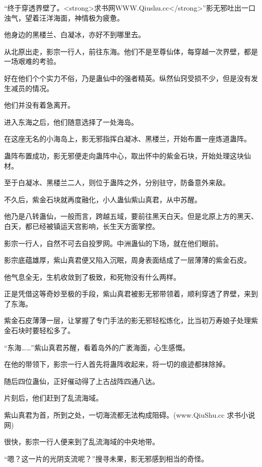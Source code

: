
\begin{this_body}

“终于穿透界壁了。<strong>求书网WWW.Qiushu.cc</strong>”影无邪吐出一口浊气，望着汪洋海面，神情极为疲惫。

他身边的黑楼兰、白凝冰，亦好不到哪里去。

从北原出走，影宗一行人，前往东海。他们不是至尊仙体，每穿越一次界壁，都是一场艰难的考验。

好在他们个个实力不俗，乃是蛊仙中的强者精英。纵然仙窍受损不少，但是没有发生减员的情况。

他们并没有着急离开。

进入东海之后，他们随意选择了一处海岛。

在这座无名的小海岛上，影无邪指挥白凝冰、黑楼兰，开始布置一座炼道蛊阵。

蛊阵布置成功，影无邪便走向蛊阵中心，取出怀中的紫金石块，开始处理这块仙材。

至于白凝冰、黑楼兰二人，则位于蛊阵之外，分别驻守，防备意外来敌。

不久后，紫金石块就再度融化，小人蛊仙紫山真君，从中苏醒。

他乃是八转蛊仙，一般而言，跨越五域，要前往黑天白天。但是北原上方的黑天、白天，都已经被镇运天宫影响，长生天方面掌控。

影宗一行人，自然不可去自投罗网。中洲蛊仙的下场，就在他们眼前。

影宗底蕴雄厚，紫山真君便又陷入沉眠，周身表面结成了一层薄薄的紫金石皮。

他气息全无，生机收敛到了极致，和死物没有什么两样。

正是凭借这等奇妙至极的手段，紫山真君被影无邪带领着，顺利穿透了界壁，来到了东海。

紫金石皮薄薄一层，让掌握了专门手法的影无邪轻松炼化，比当初万寿娘子处理紫金石块时要轻松多了。

“东海……”紫山真君苏醒，看着岛外的广袤海面，心生感慨。

在他的带领下，影宗一行人首先将蛊阵收起来，将一切的痕迹都抹除掉。

随后四位蛊仙，正好催动得了上古战阵四通八达。

片刻后，他们赶到了乱流海域。

紫山真君为首，所到之处，一切海流都无法构成阻碍。(www.QiuShu.cc 求书小说网)

很快，影宗一行人便来到了乱流海域的中央地带。

“嗯？这一片的光阴支流呢？”搜寻未果，影无邪感到相当的奇怪。


\end{this_body}
